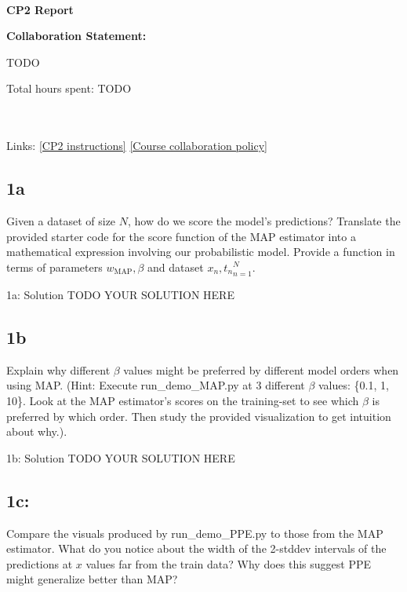 \documentclass[10pt]{article}
\newcommand{\officialdirections}[1]{{\color{purple} #1}}
\begin{document}
~~\\ %

{\Large{\bf CP2 Report }}

\Large{\bf Collaboration Statement:}

TODO

Total hours spent: TODO

~~\\
~~\\
Links: 
\href{https://www.cs.tufts.edu/cs/136/2024s/cp2.html}{[CP2 instructions]} 
\href{https://www.cs.tufts.edu/cs/136/2024s/index.html#collaboration}{[Course collaboration policy]} 

\setcounter{tocdepth}{2}
\tableofcontents

\newpage

\subsection{1a}
\officialdirections{
Given a dataset of size $N$, how do we score the model's predictions? Translate the provided starter code for the score function of the MAP estimator into a mathematical expression involving our probabilistic model. Provide a function in terms of parameters $w_\text{MAP}, \beta$ and dataset ${x_n,t_n}_{n=1}^N$.}

1a: Solution
TODO YOUR SOLUTION HERE

\subsection{1b}
\officialdirections{Explain why different $\beta$ values might be preferred by different model orders when using MAP. (Hint: Execute run\_demo\_MAP.py at 3 different $\beta$ values: \{0.1, 1, 10\}. Look at the MAP estimator's scores on the training-set to see which $\beta$ is preferred by which order. Then study the provided visualization to get intuition about why.).}

1b: Solution
TODO YOUR SOLUTION HERE

\subsection{1c:}
\officialdirections{Compare the visuals produced by run\_demo\_PPE.py to those from the MAP estimator. What do you notice about the width of the 2-stddev intervals of the predictions at $x$ values far from the train data? Why does this suggest PPE might generalize better than MAP?}
\end{document}
